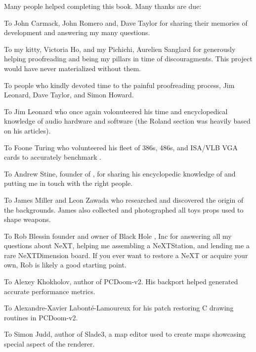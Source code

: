Many people helped completing this book. Many thanks are due:\\
\par
To John Carmack, John Romero and, Dave Taylor for sharing their memories of \doom{} development and answering my many questions.\\
\par
To my kitty, Victoria Ho, and my Pichichi, Aurelien Sanglard for generously helping proofreading and being my pillars in time of discouragments. This project would have never materialized without them.\\ 
\par
To people who kindly devoted time to the painful proofreading process, Jim Leonard, Dave Taylor, and Simon Howard.\\
\par
To Jim Leonard who once again volonuteered his time and encyclopedical knowledge of audio hardware and software (the Roland section was heavily based on his articles).\\
\par
To Foone Turing who volunteered his fleet of 386s, 486s, and ISA/VLB VGA cards to accurately benchmark \doom{}.\\
\par
To Andrew Stine, founder of , for sharing his encyclopedic knowledge of \doom{} and putting me in touch with the right people.\\
\par
To James Miller and Leon Zawada who researched and discovered the origin of the backgrounds. James also collected and photographed all toys props used to shape \doom{} weapons.\\
\par
To Rob Blessin founder and owner of Black Hole , Inc for answering all my questions about NeXT, helping me assembling a NeXTStation, and lending me a rare NeXTDimension board. If you ever want to restore a NeXT or acquire your own, Rob is likely a good starting point.\\
\par
To Alexey Khokholov, author of PCDoom-v2. His backport helped generated accurate performance metrics.\\
\par
To Alexandre-Xavier Labont\'e-Lamoureux for his patch restoring C drawing routines in PCDoom-v2.\\
\par
To Simon Judd, author of Slade3, a map editor used to create maps showcasing special aspect of the renderer.\\
